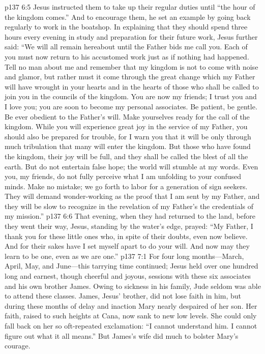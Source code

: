 \vs p137 6:5 Jesus instructed them to take up their regular duties until “the hour of the kingdom comes.” And to encourage them, he set an example by going back regularly to work in the boatshop. In explaining that they should spend three hours every evening in study and preparation for their future work, Jesus further said: \textcolor{ubdarkred}{“We will all remain hereabout until the Father bids me call you. Each of you must now return to his accustomed work just as if nothing had happened. Tell no man about me and remember that my kingdom is not to come with noise and glamor, but rather must it come through the great change which my Father will have wrought in your hearts and in the hearts of those who shall be called to join you in the councils of the kingdom. You are now my friends; I trust you and I love you; you are soon to become my personal associates. Be patient, be gentle. Be ever obedient to the Father’s will. Make yourselves ready for the call of the kingdom. While you will experience great joy in the service of my Father, you should also be prepared for trouble, for I warn you that it will be only through much tribulation that many will enter the kingdom. But those who have found the kingdom, their joy will be full, and they shall be called the blest of all the earth. But do not entertain false hope; the world will stumble at my words. Even you, my friends, do not fully perceive what I am unfolding to your confused minds. Make no mistake; we go forth to labor for a generation of sign seekers. They will demand wonder\hyp{}working as the proof that I am sent by my Father, and they will be slow to recognize in the revelation of my Father’s  the credentials of my mission.”}
\vs p137 6:6 That evening, when they had returned to the land, before they went their way, Jesus, standing by the water’s edge, prayed: \textcolor{ubdarkred}{“My Father, I thank you for these little ones who, in spite of their doubts, even now believe. And for their sakes have I set myself apart to do your will. And now may they learn to be one, even as we are one.”}
\vs p137 7:1 For four long months---March, April, May, and June---this tarrying time continued; Jesus held over one hundred long and earnest, though cheerful and joyous, sessions with these six associates and his own brother James. Owing to sickness in his family, Jude seldom was able to attend these classes. James, Jesus’ brother, did not lose faith in him, but during these months of delay and inaction Mary nearly despaired of her son. Her faith, raised to such heights at Cana, now sank to new low levels. She could only fall back on her so oft\hyp{}repeated exclamation: “I cannot understand him. I cannot figure out what it all means.” But James’s wife did much to bolster Mary’s courage.
